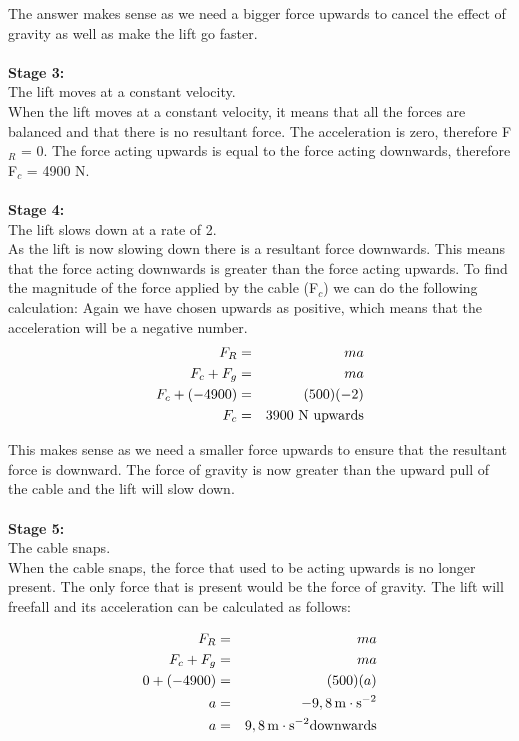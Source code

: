 The answer makes sense as we need a bigger force upwards to cancel the effect of gravity as well as make the lift go faster.\\
\\
{\bf{Stage 3:}}\\ The lift moves at a constant velocity.\\
When the lift moves at a constant velocity, it means that all the forces are balanced and that there is no resultant force. The acceleration is zero, therefore F$_{R}$ = 0. The force acting upwards is equal to the force acting downwards, therefore F$_{c}$ = 4900 N.\\
\\
{\bf{Stage 4:}}\\ The lift slows down at a rate of 2\mss.\\
As the lift is now slowing down there is a resultant force downwards. This means that the force acting downwards is greater than the force acting upwards. To find the magnitude of the force applied by the cable (F$_{c}$) we can do the following calculation: Again we have chosen upwards as positive, which means that the acceleration will be a negative number.\\

\begin{eqnarray*}
F_{R} &=& ma\\
F_{c}+ F_{g} &=& ma\\
F_{c}+ (-4900) &=& (500)(-2)\\
F_{c} &=& 3900~\rm{N~upwards}
\end{eqnarray*}

This makes sense as we need a smaller force upwards to ensure that the resultant force is downward. The force of gravity is now greater than the upward pull of the cable and the lift will slow down.\\
\\
{\bf{Stage 5:}}\\ The cable snaps.\\
When the cable snaps, the force that used to be acting upwards is no longer present. The only force that is present would be the force of gravity. The lift will freefall and its acceleration can be calculated as follows:

\begin{eqnarray*}
F_{R} &=& ma\\
F_{c}+ F_{g} &=& ma\\
0 + (-4900) &=& (500)(a)\\
a &=& -9,8 \,\mathrm{m \cdot s^{-2}}\\
a &=& 9,8 \,\mathrm{m \cdot s^{-2}} \rm{downwards}
\end{eqnarray*}

